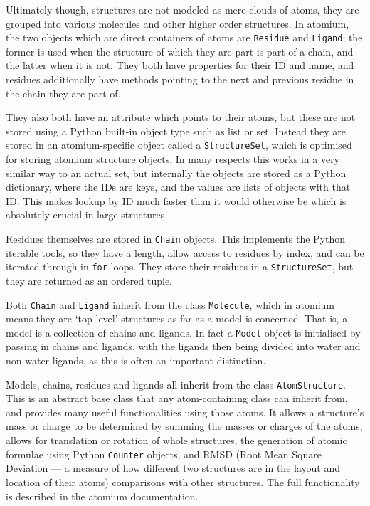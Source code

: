 Ultimately though, structures are not modeled as mere clouds of atoms, they are grouped into various molecules and other higher order structures. In atomium, the two objects which are direct containers of atoms are \texttt{Residue} and \texttt{Ligand}; the former is used when the structure of which they are part is part of a chain, and the latter when it is not. They both have properties for their ID and name, and residues additionally have methods pointing to the next and previous residue in the chain they are part of.

They also both have an attribute which points to their atoms, but these are not stored using a Python built-in object type such as list or set. Instead they are stored in an atomium-specific object called a \texttt{StructureSet}, which is optimised for storing atomium structure objects. In many respects this works in a very similar way to an actual set, but internally the objects are stored as a Python dictionary, where the IDs are keys, and the values are lists of objects with that ID. This makes lookup by ID much faster than it would otherwise be which is absolutely crucial in large structures.

Residues themselves are stored in \texttt{Chain} objects. This implements the Python iterable tools, so they have a length, allow access to residues by index, and can be iterated through in \texttt{for} loops. They store their residues in a \texttt{StructureSet}, but they are returned as an ordered tuple.

Both \texttt{Chain} and \texttt{Ligand} inherit from the class \texttt{Molecule}, which in atomium means they are `top-level' structures as far as a model is concerned. That is, a model is a collection of chains and ligands. In fact a \texttt{Model} object is initialised by passing in chains and ligands, with the ligands then being divided into water and non-water ligands, as this is often an important distinction.

Models, chains, residues and ligands all inherit from the class \texttt{AtomStructure}. This is an abstract base class that any atom-containing class can inherit from, and provides many useful functionalities using those atoms. It allows a structure's mass or charge to be determined by summing the masses or charges of the atoms, allows for translation or rotation of whole structures, the generation of atomic formulae using Python \texttt{Counter} objects, and RMSD (Root Mean Square Deviation --- a measure of how different two structures are in the layout and location of their atoms) comparisons with other structures. The full functionality is described in the atomium documentation.

